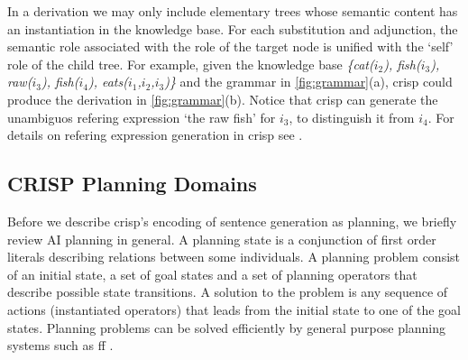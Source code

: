In a derivation we may only include elementary trees whose semantic content has an instantiation in the knowledge base. For each substitution and adjunction, the semantic role associated with the role of the target node is unified with the `self' role of the child tree. For example, given the knowledge base 
{\it \{cat($i_2$), fish($i_3$), raw($i_3$), fish($i_4$), eats($i_1$,$i_2$,$i_3$)\}} and the grammar in \ref{fig:grammar}(a), {\sc crisp} could produce the derivation in \ref{fig:grammar}(b). Notice that {\sc crisp} can generate the unambiguos refering expression `the raw fish' for $i_3$, to distinguish it from $i_4$. For details on  refering expression generation in {\sc crisp} see .


\subsection{CRISP Planning Domains} 
\label{ssec:crispdomain}
Before we describe {\sc crisp}'s encoding of sentence generation as planning, we briefly review AI planning in general. 
A planning state is a conjunction of first order literals describing relations between some individuals. A planning problem consist of an initial state, a set of goal states and a set of planning operators that describe possible state transitions.  A solution to the problem is any sequence of actions (instantiated operators) that leads from the initial state to one of the goal states. Planning problems can be solved efficiently by general purpose planning systems such as 
{\sc ff} \cite{hoffmannnebel2001}.  
     
